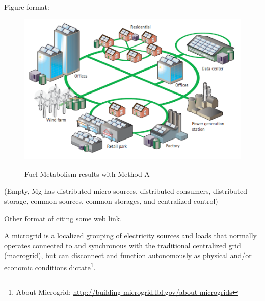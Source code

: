 	Figure format:
	\begin{figure}[ht]
	  \centering                %
	  \scalebox{0.5}            %
	  {\includegraphics{microgrid.png}}   %
	  \caption{Fuel Metabolism results with Method A}        %
	  \label{fig:exm}                  %
	\end{figure}
	
	(Empty, Mg has distributed micro-sources, distributed consumers, distributed storage, common sources, common storages, and centralized control)\cite{wood2012power}
	
	Other format of citing some web link\cite{bworld}.
	
	A microgrid is a localized grouping of electricity sources and loads that normally operates connected to and synchronous with the traditional centralized grid (macrogrid), but can disconnect and function autonomously as physical and/or economic conditions dictate\footnote{About Microgrid: \url{http://building-microgrid.lbl.gov/about-microgrids}}.
	
